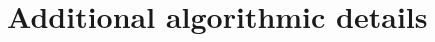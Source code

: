 \documentclass[11pt]{article}
\newcommand{\calL}{\mathcal{L}}
\newcommand{\calM}{\mathcal{M}}
\newcommand{\calT}{\mathcal{T}}
\newcommand{\bx}{\bm{x}}
\newcommand{\bz}{\bm{z}}
\newcommand{\btheta}{\boldsymbol{\theta}}
\theoremstyle{plain}
\theoremstyle{definition}
\theoremstyle{plain}
\begin{document}
\section{Additional algorithmic details}
\label{sec:extraalgorithm}

\end{document}
